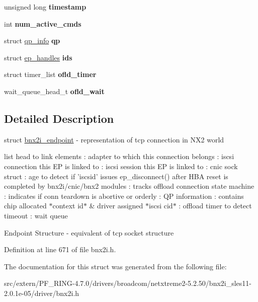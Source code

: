 \begin{DoxyCompactItemize}
\item 
\hypertarget{structbnx2i__endpoint_ac098c982c0046de838b02615f998c911}{
unsigned long {\bfseries timestamp}}
\label{structbnx2i__endpoint_ac098c982c0046de838b02615f998c911}

\item 
\hypertarget{structbnx2i__endpoint_a0053c58b3379ee013c4e9efd55bf8cba}{
int {\bfseries num\_\-active\_\-cmds}}
\label{structbnx2i__endpoint_a0053c58b3379ee013c4e9efd55bf8cba}

\item 
\hypertarget{structbnx2i__endpoint_a0fb163e6a91e6d5e9066145bb6fdac9e}{
struct \hyperlink{structqp__info}{qp\_\-info} {\bfseries qp}}
\label{structbnx2i__endpoint_a0fb163e6a91e6d5e9066145bb6fdac9e}

\item 
\hypertarget{structbnx2i__endpoint_a9e0983cd73945eb0f158e80efe373a42}{
struct \hyperlink{structep__handles}{ep\_\-handles} {\bfseries ids}}
\label{structbnx2i__endpoint_a9e0983cd73945eb0f158e80efe373a42}

\item 
\hypertarget{structbnx2i__endpoint_a1e154d93efc2ec194ca49f8f5989bd2c}{
struct timer\_\-list {\bfseries ofld\_\-timer}}
\label{structbnx2i__endpoint_a1e154d93efc2ec194ca49f8f5989bd2c}

\item 
\hypertarget{structbnx2i__endpoint_a274c1a1a6730724ef2d139d7081d5e13}{
wait\_\-queue\_\-head\_\-t {\bfseries ofld\_\-wait}}
\label{structbnx2i__endpoint_a274c1a1a6730724ef2d139d7081d5e13}

\end{DoxyCompactItemize}


\subsection{Detailed Description}
struct \hyperlink{structbnx2i__endpoint}{bnx2i\_\-endpoint} -\/ representation of tcp connection in NX2 world

list head to link elements : adapter to which this connection belongs : iscsi connection this EP is linked to : iscsi session this EP is linked to : cnic sock struct : age to detect if 'iscsid' issues ep\_\-disconnect() after HBA reset is completed by bnx2i/cnic/bnx2 modules : tracks offload connection state machine : indicates if conn teardown is abortive or orderly : QP information : contains chip allocated $\ast$context id$\ast$ \& driver assigned $\ast$iscsi cid$\ast$ : offload timer to detect timeout : wait queue

Endpoint Structure -\/ equivalent of tcp socket structure 

Definition at line 671 of file bnx2i.h.



The documentation for this struct was generated from the following file:\begin{DoxyCompactItemize}
\item 
src/extern/PF\_\-RING-\/4.7.0/drivers/broadcom/netxtreme2-\/5.2.50/bnx2i\_\-sles11-\/2.0.1e-\/05/driver/bnx2i.h\end{DoxyCompactItemize}
